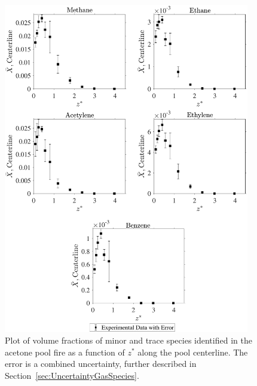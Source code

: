 \documentclass[12pt]{article}
\begin{document}
\begin{figure}[!h]
	\centering
\includegraphics[width=10.75cm,keepaspectratio]{Acetone_Inter_MOL_FRAC_Plot.pdf}
	\caption[Volume fractions of minor and trace species in the acetone plume]{Plot of volume fractions of minor and trace species identified in the acetone pool fire as a function of $z^{*}$ along the pool centerline. The error is a combined uncertainty, further described in Section~\ref{sec:UncertaintyGasSpecies}.}
	\label{fig:Acetone_VOL_Frac_Inter}
\end{figure}

\clearpage
\end{document}
